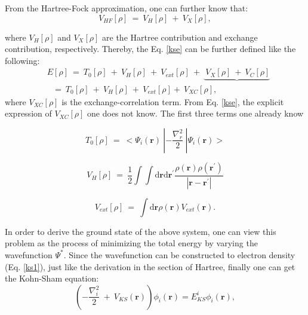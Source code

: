 \documentclass[a4paper, 12pt, titlepage,oneside,drop]{kthesis}
\begin{document}
\noindent From the Hartree-Fock approximation, one can further know that:
\begin{equation}
 V_\textit{HF}[\rho] \ = \ V_\textit{H}[\rho] \ + \ V_\textit{X}[\rho], 
\end{equation}

\noindent where $V_\textit{H}[\rho]$ and $ V_\textit{X}[\rho] $ are the Hartree contribution and exchange contribution, respectively. Thereby, the Eq. \ref{kse} can be further defined like
 the following:
\begin{equation}\label{ccc}
\begin{split}
&E[\rho]\ = \ T_{0}[\rho] \ + \ V_\textit{H}[\rho] \ + \ V_\textit{ext}[\rho] \ + \ \underbrace{\ V_\textit{X}[\rho]  \ + \ V_\textit{C}[\rho]}  \\
&\ \ \ = \ T_{0}[\rho] \ + \ V_\textit{H}[\rho] \ + \ V_\textit{ext}[\rho] + \ V_\textit{XC}[\rho],
\end{split}\end{equation}
\noindent where $V_\textit{XC}[\rho]$  is the exchange-correlation term. From Eq. \ref{kse}, the explicit expression of $V_\textit{XC}[\rho]$ one does not know. 
The first three terms one already know

\begin{equation}
 T_{0}[\rho]\ = \ < \Psi_{i}(\textbf{r}) \ | -\frac{\nabla^{2}_{r}}{2} \ | \Psi_{i}(\textbf{r}) >
\end{equation}

\begin{equation}
V_\textit{H}[\rho] \ = \ \frac{1}{2} \int \int \mathrm{d} {\textbf{r}} \mathrm{d}{\textbf{r}^{\prime}} \frac{\rho({\textbf{r}})\rho(\textbf{r}^{\prime})}{|{\textbf{r}}-{\textbf{r}}^{\prime}|}
\end{equation}


\begin{equation}
V_\textit{ext}[\rho]\ = \ \int \mathrm{d}{\textbf{r}} \rho(\textbf{r}) V_\textit{ext}(\textbf{r}). 
\end{equation}

\noindent In order to derive the ground state of the above system, one can view this problem as the process of minimizing the total energy by varying the wavefunction $\Psi^*$. Since
 the wavefunction can be constructed to electron density (Eq. \ref{ks1}), just like the derivation in the section of Hartree, finally one can get the Kohn-Sham equation:
\begin{equation}\label{aaa}
 (-\frac{\nabla^{2}_{i}}{2}\ + \ V_\textit{KS}(\textbf{r})) \phi_{\textit{i}}(\textbf{r}) = E_{\textit{KS}}^{\textit{i}} \phi_{\textit{i}}(\textbf{r}),
\end{equation}
\end{document}
